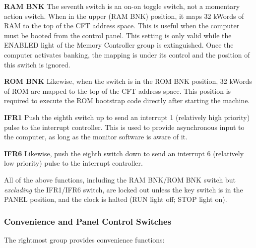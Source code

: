 \documentclass[11pt,a4paper,twocolumns]{article}
\newcommand{\lt}[1]{\textsf{#1}}
\newcommand{\sw}[1]{\textsf{#1}}
\begin{document}
\begin{description}
\item{\bf\sw{RAM BNK}} The seventh switch is an on-on toggle switch,
  not a momentary action switch. When in the upper (\sw {RAM BNK})
  position, it maps 32 kWords of RAM to the top of the CFT address
  space. This is useful when the computer must be booted from the
  control panel. This setting is only valid while the \lt{ENABLED}
  light of the Memory Controller group is extinguished. Once the
  computer activates banking, the mapping is under its control and the
  position of this switch is ignored.
\item{\bf\sw{ROM BNK}} Likewise, when the switch is in the \sw{ROM
  BNK} position, 32 kWords of ROM are mapped to the top of the CFT
  address space. This position is required to execute the ROM
  bootstrap code directly after starting the machine.

\item{\bf\sw{IFR1}} Push the eighth switch up to send an interrupt 1
  (relatively high priority) pulse to the interrupt controller. This
  is used to provide asynchronous input to the computer, as long as
  the monitor software is aware of it.
\item{\bf\sw{IFR6}} Likewise, push the eighth switch down to send an
  interrupt 6 (relatively low priority) pulse to the interrupt
  controller.

\end{description}

All of the above functions, including the {\sw{RAM BNK}/\sw{ROM BNK}}
switch but {\em excluding\/} the \sw{IFR1}/\sw{IFR6} switch, are
locked out unless the key switch is in the \sw{PANEL} position, and
the clock is halted (\lt{RUN} light off; \lt{STOP} light on).

\subsubsection{Convenience and Panel Control Switches}

The rightmost group provides convenience functions:
\end{document}
